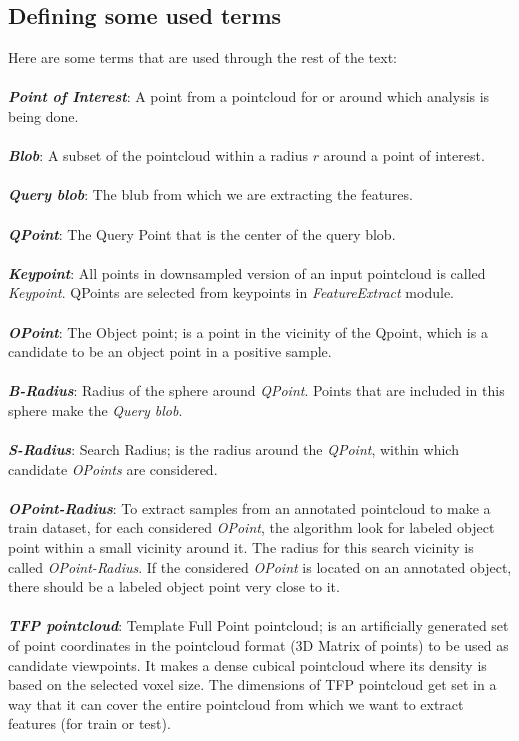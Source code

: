 \subsection{Defining some used terms}

Here are some terms that are used through the rest of the text:\\
\\
\textbf{\textit{Point of Interest}}: A point from a pointcloud for or around which analysis is being done.\\
\\
\textbf{\textit{Blob}}: A subset of the pointcloud within a radius $r$ around a point of interest.\\
\\
\textbf{\textit{Query blob}}: The blub from which we are extracting the features.\\
\\
\textbf{\textit{QPoint}}: The Query Point that is the center of the query blob.\\
\\
\textbf{\textit{Keypoint}}: All points in downsampled version of an input pointcloud is called {\it Keypoint}. QPoints are selected from keypoints in {\it FeatureExtract} module.\\
\\
\textbf{\textit{OPoint}}: The Object point; is a point in the vicinity of the Qpoint, which is a candidate to be an object point in a positive sample.\\
\\
\textbf{\textit{B-Radius}}: Radius of the sphere around {\it QPoint}. Points that are included in this sphere make the {\it Query blob}.\\
\\
\textbf{\textit{S-Radius}}: Search Radius; is the radius around the {\it QPoint}, within which candidate {\it OPoints} are considered.\\
\\
\textbf{\textit{OPoint-Radius}}: To extract samples from an annotated pointcloud to make a train dataset, for each considered {\it OPoint}, the algorithm look for labeled object point within a small vicinity around it. The radius for this search vicinity is called {\it OPoint-Radius}. If the considered {\it OPoint} is located on an annotated object, there should be a labeled object point very close to it.\\ 
\\
\textbf{\textit{TFP pointcloud}}: Template Full Point pointcloud; is an artificially generated set of point coordinates in the pointcloud format (3D Matrix of points) to be used as candidate viewpoints. It makes a dense cubical pointcloud where its density is based on the selected voxel size. The dimensions of TFP pointcloud get set in a way that it can cover the entire pointcloud from which we want to extract features (for train or test).\\
